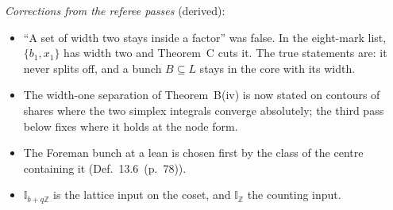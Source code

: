 \documentclass[11pt]{article}
\newcommand{\IZ}{\mathbb I_{\mathbb Z}}
\newcommand{\Ilat}[1]{\mathbb I_{#1}}
\newcommand{\hb}[2]{#1~(p.~#2)}   %
\theoremstyle{plain}
\theoremstyle{remark}
\begin{document}
\emph{Corrections from the referee passes} (derived):
\begin{itemize}
\item ``A set of width two stays inside a factor'' was false. In the eight-mark list, $\{b_1,x_1\}$ has width two and Theorem~C cuts it. The true statements are: it never splits off, and a bunch $B\subseteq L$ stays in the core with its width.
\item The width-one separation of Theorem~B(iv) is now stated on contours of shares where the two simplex integrals converge absolutely; the third pass below fixes where it holds at the node form.
\item The Foreman bunch at a lean is chosen first by the class of the centre containing it (Def.~\hb{13.6}{78}).
\item $\Ilat{b+q\mathbb Z}$ is the lattice input on the coset, and $\IZ$ the counting input.
\end{itemize}
\end{document}
